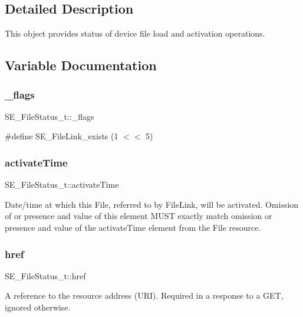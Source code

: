 \subsection{Detailed Description}
This object provides status of device file load and activation operations. 

\subsection{Variable Documentation}
\mbox{\label{group__FileStatus_ga4b3b27fbcfaf0fc19ac6bd5d54afd811}} 
\subsubsection{\texorpdfstring{\+\_\+flags}{\_flags}}
{\footnotesize\ttfamily S\+E\+\_\+\+File\+Status\+\_\+t\+::\+\_\+flags}

\#define S\+E\+\_\+\+File\+Link\+\_\+exists (1 $<$$<$ 5) \mbox{\label{group__FileStatus_gaf741987e3e6783c64bf119b24dde669f}} 
\subsubsection{\texorpdfstring{activate\+Time}{activateTime}}
{\footnotesize\ttfamily S\+E\+\_\+\+File\+Status\+\_\+t\+::activate\+Time}

Date/time at which this File, referred to by File\+Link, will be activated. Omission of or presence and value of this element M\+U\+ST exactly match omission or presence and value of the activate\+Time element from the File resource. \mbox{\label{group__FileStatus_gab42569063c0f1f2ecbacadf94a84692b}} 
\subsubsection{\texorpdfstring{href}{href}}
{\footnotesize\ttfamily S\+E\+\_\+\+File\+Status\+\_\+t\+::href}

A reference to the resource address (U\+RI). Required in a response to a G\+ET, ignored otherwise. \mbox{\label{group__FileStatus_ga10c95c145e19e06b777320bf0a2dd354}} 
